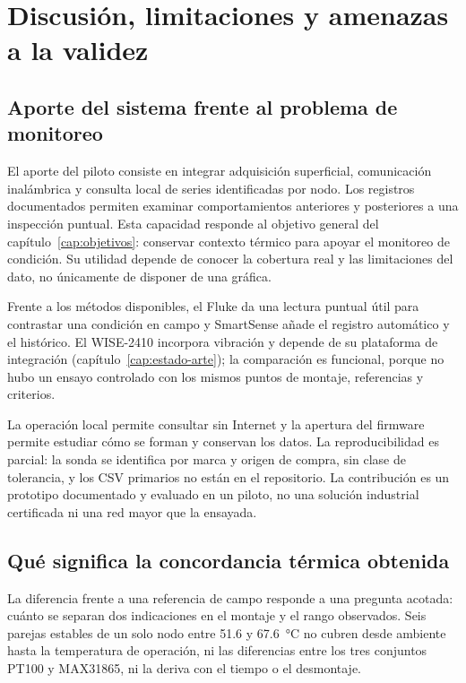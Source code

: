 \chapter{Discusión, limitaciones y amenazas a la validez}
\label{cap:discusion}

\section{Aporte del sistema frente al problema de monitoreo}
El aporte del piloto consiste en integrar adquisición superficial, comunicación inalámbrica y consulta local de series identificadas por nodo. Los \TotalMuestras{} registros documentados permiten examinar comportamientos anteriores y posteriores a una inspección puntual. Esta capacidad responde al objetivo general del capítulo~\ref{cap:objetivos}: conservar contexto térmico para apoyar el monitoreo de condición. Su utilidad depende de conocer la cobertura real y las limitaciones del dato, no únicamente de disponer de una gráfica.

Frente a los métodos disponibles, el Fluke da una lectura puntual útil para contrastar una condición en campo y SmartSense añade el registro automático y el histórico. El WISE-2410 incorpora vibración y depende de su plataforma de integración (capítulo~\ref{cap:estado-arte}); la comparación es funcional, porque no hubo un ensayo controlado con los mismos puntos de montaje, referencias y criterios.

La operación local permite consultar sin Internet y la apertura del firmware permite estudiar cómo se forman y conservan los datos. La reproducibilidad es parcial: la sonda se identifica por marca y origen de compra, sin clase de tolerancia, y los CSV primarios no están en el repositorio. La contribución es un prototipo documentado y evaluado en un piloto, no una solución industrial certificada ni una red mayor que la ensayada.

\section{Qué significa la concordancia térmica obtenida}
La diferencia frente a una referencia de campo responde a una pregunta acotada: cuánto se separan dos indicaciones en el montaje y el rango observados. Seis parejas estables de un solo nodo entre 51.6 y \SI{67.6}{\celsius} no cubren desde ambiente hasta la temperatura de operación, ni las diferencias entre los tres conjuntos PT100 y MAX31865, ni la deriva con el tiempo o el desmontaje.

